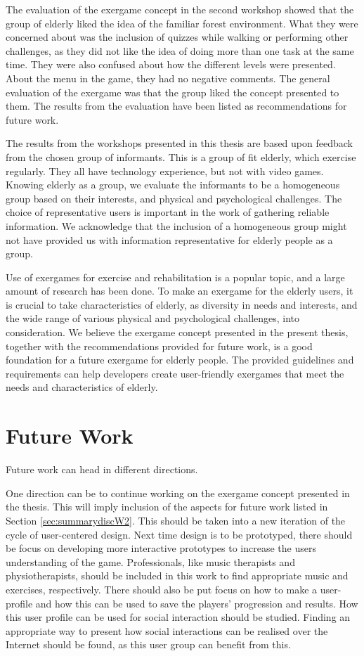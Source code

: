 The evaluation of the exergame concept in the second workshop showed that the group of elderly liked the idea of the familiar forest environment. What they were concerned about was the inclusion of quizzes while walking or performing other challenges, as they did not like the idea of doing more than one task at the same time. They were also confused about how the different levels were presented. About the menu in the game, they had no negative comments. The general evaluation of the exergame was that the group liked the concept presented to them. The results from the evaluation have been listed as recommendations for future work. 

The results from the workshops presented in this thesis are based upon feedback from the chosen group of informants. This is a group of fit elderly, which exercise regularly. They all have technology experience, but not with video games. Knowing elderly as a group, we evaluate the informants to be a homogeneous group based on their interests, and physical and psychological challenges. The choice of representative users is important in the work of gathering reliable information. We acknowledge that the inclusion of a homogeneous group might not have provided us with information representative for elderly people as a group. 

Use of exergames for exercise and rehabilitation is a popular topic, and a large amount of research has been done. To make an exergame for the elderly users, it is crucial to take characteristics of elderly, as diversity in needs and interests, and the wide range of various physical and psychological challenges, into consideration. We believe the exergame concept presented in the present thesis, together with the recommendations provided for future work, is a good foundation for a future exergame for elderly people. The provided guidelines and requirements can help developers create user-friendly exergames that meet the needs and characteristics of elderly.
 
\section{Future Work}

Future work can head in different directions. 

One direction can be to continue working on the exergame concept presented in the thesis. This will imply inclusion of the aspects for future work listed in Section \ref{sec:summarydiscW2}. This should be taken into a new iteration of the cycle of user-centered design. Next time design is to be prototyped, there should be focus on developing more interactive prototypes to increase the users understanding of the game. Professionals, like music therapists and physiotherapists, should be included in this work to find appropriate music and exercises, respectively. There should also be put focus on how to make a user-profile and how this can be used to save the players' progression and results. How this user profile can be used for social interaction should be studied. Finding an appropriate way to present how social interactions can be realised over the Internet should be found, as this user group can benefit from this. 

